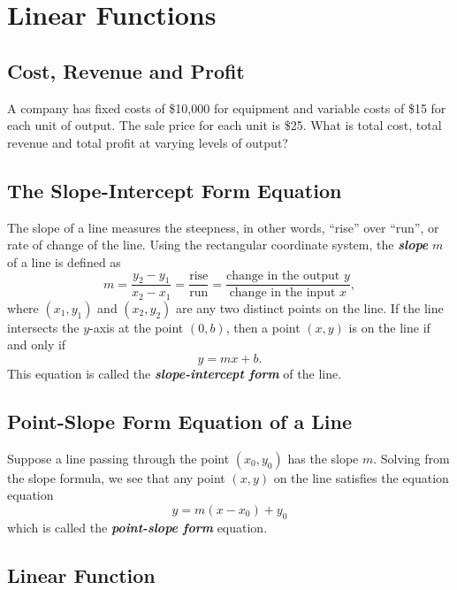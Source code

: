
\hypertarget{linear-functions}{%
\section{Linear Functions}\label{linear-functions}}

\hypertarget{cost-revenue-and-profit}{%
\subsection{Cost, Revenue and Profit}\label{cost-revenue-and-profit}}

A company has fixed costs of \$10,000 for equipment and variable costs
of \$15 for each unit of output. The sale price for each unit is \$25.
What is total cost, total revenue and total profit at varying levels of
output?

\hypertarget{the-slope-intercept-form-equation}{%
\subsection{The Slope-Intercept Form
Equation}\label{the-slope-intercept-form-equation}}

The slope of a line measures the steepness, in other words, ``rise''
over ``run'', or rate of change of the line. Using the rectangular
coordinate system, the \textbf{\emph{slope}} \(m\) of a line is defined
as \[
m=\dfrac{y_2-y_1}{x_2-x_1}=\dfrac{\text{rise}}{\text{run}}=\dfrac{\text{change in the output }y}{\text{change in the input } x},
\] where \((x_1, y_1)\) and \((x_2, y_2)\) are any two distinct points
on the line. If the line intersects the \(y\)-axis at the point
\((0, b)\), then a point \((x, y)\) is on the line if and only if \[
y=mx+b.
\] This equation is called the \textbf{\emph{slope-intercept form}} of
the line.

\hypertarget{point-slope-form-equation-of-a-line}{%
\subsection{Point-Slope Form Equation of a
Line}\label{point-slope-form-equation-of-a-line}}

Suppose a line passing through the point \((x_0, y_0)\) has the slope
\(m\). Solving from the slope formula, we see that any point \((x, y)\)
on the line satisfies the equation equation \[
y=m(x-x_0)+y_0
\] which is called the \textbf{\emph{point-slope form}} equation.

\hypertarget{linear-function}{%
\subsection{Linear Function}\label{linear-function}}

